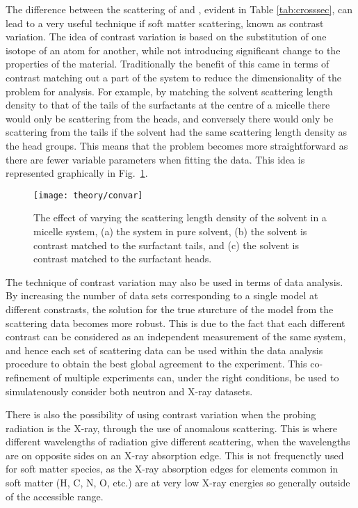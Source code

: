 %
The difference between the scattering of  and , evident in Table \ref{tab:crosssec}, can lead to a very useful technique if soft matter scattering, known as contrast variation. The idea of contrast variation is based on the substitution of one isotope of an atom for another, while not introducing significant change to the properties of the material. Traditionally the benefit of this came in terms of contrast matching out a part of the system to reduce the dimensionality of the problem for analysis. For example, by matching the solvent scattering length density to that of the tails of the surfactants at the centre of a micelle there would only be scattering from the heads, and conversely there would only be scattering from the tails if the solvent had the same scattering length density as the head groups. This means that the problem becomes more straightforward as there are fewer variable parameters when fitting the data. This idea is represented graphically in Fig.~\ref{fig:convar}.
%
\begin{figure}
	\centering
	\texttt{[image: theory/convar]}
	\caption{The effect of varying the scattering length density of the solvent in a micelle system, (a) the system in pure solvent, (b) the solvent is contrast matched to the surfactant tails, and (c) the solvent is contrast matched to the surfactant heads.}
	\label{fig:convar}
\end{figure}
%
The technique of contrast variation may also be used in terms of data analysis. By increasing the number of data sets corresponding to a single model at different constrasts, the solution for the true sturcture of the model from the scattering data becomes more robust. This is due to the fact that each different contrast can be considered as an independent measurement of the same system, and hence each set of scattering data can be used within the data analysis procedure to obtain the best global agreement to the experiment. This co-refinement of multiple experiments can, under the right conditions, be used to simulatenously consider both neutron and X-ray datasets.\cite{Nelson2006}

There is also the possibility of using contrast variation when the probing radiation is the X-ray, through the use of anomalous scattering. This is where different wavelengths of radiation give different scattering, when the wavelengths are on opposite sides on an X-ray absorption edge. This is not frequenctly used for soft matter species, as the X-ray absorption edges for elements common in soft matter (H, C, N, O, etc.) are at very low X-ray energies so generally outside of the accessible range. \cite{Schurtenberger2002}
